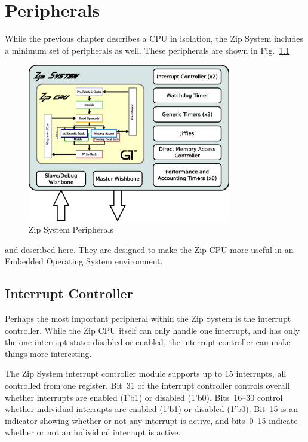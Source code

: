 \documentclass{gqtekspec}
\begin{document}
\chapter{Peripherals}\label{chap:periph}

While the previous chapter describes a CPU in isolation, the Zip System
includes a minimum set of peripherals as well.  These peripherals are shown
in Fig.~\ref{fig:zipsystem}
\begin{figure}\begin{center}
\includegraphics[width=3.5in]{../gfx/system.eps}
\caption{Zip System Peripherals}\label{fig:zipsystem}
\end{center}\end{figure}
and described here.  They are designed to make
the Zip CPU more useful in an Embedded Operating System environment.

\section{Interrupt Controller}\label{sec:pic}

Perhaps the most important peripheral within the Zip System is the interrupt
controller.  While the Zip CPU itself can only handle one interrupt, and has
only the one interrupt state: disabled or enabled, the interrupt controller
can make things more interesting.

The Zip System interrupt controller module supports up to 15 interrupts, all
controlled from one register.  Bit~31 of the interrupt controller controls
overall whether interrupts are enabled (1'b1) or disabled (1'b0).  Bits~16--30
control whether individual interrupts are enabled (1'b1) or disabled (1'b0).
Bit~15 is an indicator showing whether or not any interrupt is active, and 
bits~0--15 indicate whether or not an individual interrupt is active.
\end{document}
